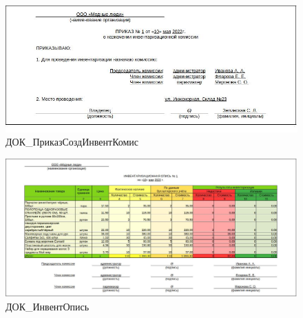\begin{figure}[!h]
    \centering

    \includegraphics[width=18cm]
    {assets/etalons/DOC_PrilazSozdInventKomis.jpg}

    \caption{ДОК\_ПриказСоздИнвентКомис}

    \label{fig:DOC_PrilazSozdInventKomis}
\end{figure}

\begin{figure}[!h]
    \centering

    \includegraphics[width=18cm]
    {assets/etalons/DOC_InventOpis'.jpg}

    \caption{ДОК\_ИнвентОпись}

    \label{fig:DOC_InventOpis}
\end{figure}
